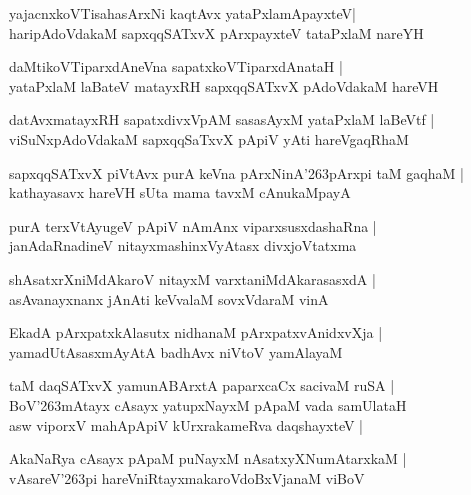 \begin{shloka}
yajacnxkoVTisahasArxNi kaqtAvx yataPxlamApayxteV|\\
haripAdoVdakaM sapxqqSATxvX pArxpayxteV tataPxlaM nareYH
\end{shloka}

\begin{shloka}
daMtikoVTiparxdAneVna sapatxkoVTiparxdAnataH |\\
yataPxlaM laBateV matayxRH sapxqqSATxvX pAdoVdakaM hareVH
\end{shloka}

\begin{shloka}
datAvxmatayxRH sapatxdivxVpAM sasasAyxM yataPxlaM laBeVtf |\\
viSuNxpAdoVdakaM sapxqqSaTxvX pApiV yAti hareVgaqRhaM
\end{shloka}

\begin{shloka}
sapxqqSATxvX piVtAvx purA keVna pArxNinA\char'263pArxpi taM gaqhaM |\\
kathayasavx hareVH sUta mama tavxM cAnukaMpayA
\end{shloka}

\begin{shloka}
purA terxVtAyugeV pApiV nAmAnx viparxsusxdashaRna |\\
janAdaRnadineV nitayxmashinxVyAtasx divxjoVtatxma
\end{shloka}

\begin{shloka}
shAsatxrXniMdAkaroV nitayxM varxtaniMdAkarasasxdA |\\
asAvanayxnanx jAnAti keVvalaM sovxVdaraM vinA
\end{shloka}

\begin{shloka}
EkadA pArxpatxkAlasutx nidhanaM pArxpatxvAnidxvXja |\\
yamadUtAsasxmAyAtA badhAvx niVtoV yamAlayaM
\end{shloka}

\begin{shloka}
taM daqSATxvX yamunABArxtA paparxcaCx sacivaM ruSA |\\
BoV\char'263mAtayx cAsayx yatupxNayxM pApaM vada samUlataH\\
asw viporxV mahApApiV kUrxrakameRva daqshayxteV |
\end{shloka}

\begin{shloka}
AkaNaRya cAsayx pApaM puNayxM nAsatxyXNumAtarxkaM |\\
vAsareV\char'263pi hareVniRtayxmakaroVdoBxVjanaM viBoV
\end{shloka}

